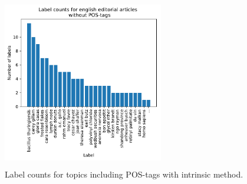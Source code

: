 {\begin{figure}[h]
\begin{minipage}[t]{0.5\textwidth}
	\end{minipage}
	\begin{minipage}[t]{0.5\textwidth}
		\includegraphics[width=7cm,height=7.5cm]{gfx/POS-gen1/ohne_POS.pdf}
	\end{minipage}
	\caption{Label counts for topics including \ac{POS}-tags with intrinsic method.}
	\label{fig:labelcount_intrinsic_pos}
\end{figure}

}
